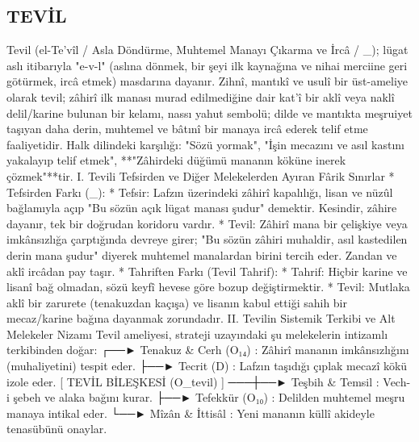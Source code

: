 \documentclass[11pt,a4paper]{article}
\begin{document}
\subsection{TEVİL}


Tevil (el-Te’vîl / Asla Döndürme, Muhtemel Manayı Çıkarma ve İrcâ / _{}); lügat aslı itibarıyla "e-v-l" (aslına dönmek, bir şeyi ilk kaynağına ve nihai merciine geri götürmek, ircâ etmek) masdarına dayanır.
Zihnî, mantıkî ve usulî bir üst-ameliye olarak tevil; zâhirî ilk manası murad edilmediğine dair kat'î bir aklî veya naklî delil/karine bulunan bir kelamı, nassı yahut sembolü; dilde ve mantıkta meşruiyet taşıyan daha derin, muhtemel ve bâtınî bir manaya ircâ ederek telif etme faaliyetidir.
Halk dilindeki karşılığı: "Sözü yormak", "İşin mecazını ve asıl kastını yakalayıp telif etmek", **"Zâhirdeki düğümü mananın köküne inerek çözmek"**tir.
I. Tevili Tefsirden ve Diğer Melekelerden Ayıran Fârik Sınırlar
 * Tefsirden Farkı (_{}):
   * Tefsir: Lafzın üzerindeki zâhirî kapalılığı, lisan ve nüzûl bağlamıyla açıp "Bu sözün açık lügat manası şudur" demektir. Kesindir, zâhire dayanır, tek bir doğrudan koridoru vardır.
   * Tevil: Zâhirî mana bir çelişkiye veya imkânsızlığa çarptığında devreye girer; "Bu sözün zâhiri muhaldir, asıl kastedilen derin mana şudur" diyerek muhtemel manalardan birini tercih eder. Zandan ve aklî ircâdan pay taşır.
 * Tahriften Farkı (Tevil \neq Tahrif):
   * Tahrif: Hiçbir karine ve lisanî bağ olmadan, sözü keyfî hevese göre bozup değiştirmektir.
   * Tevil: Mutlaka aklî bir zarurete (tenakuzdan kaçışa) ve lisanın kabul ettiği sahih bir mecaz/karine bağına dayanmak zorundadır.
II. Tevilin Sistemik Terkibi ve Alt Melekeler Nizamı
Tevil ameliyesi,  strateji uzayındaki şu melekelerin intizamlı terkibinden doğar:
                                  ┌──► Tenakuz & Cerh (O₁₄) : Zâhirî mananın imkânsızlığını (muhaliyetini) tespit eder.
                                  ├──► Tecrit (D)          : Lafzın taşıdığı çıplak mecazî kökü izole eder.
[ TEVİL BİLEŞKESİ (O_tevil) ] ───┼──► Teşbih & Temsil     : Vech-i şebeh ve alaka bağını kurar.
                                  ├──► Tefekkür (O₁₀)      : Delilden muhtemel meşru manaya intikal eder.
                                  └──► Mîzân & İttisâl     : Yeni mananın küllî akideyle tenasübünü onaylar.
\end{document}
